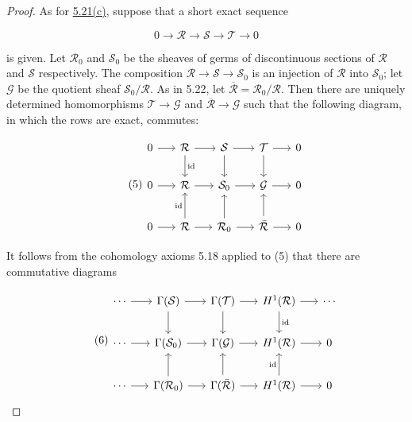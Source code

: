 \begin{proof}
As for \hyperref[thm:5.21]{5.21(c)}, suppose that a short exact sequence

\begin{equation}
\tag{4}\label{eq:5.23:4}
0\to\mathcal{R}\to\mathcal{S}\to\mathcal{T}\to0
\end{equation}

is given. Let $\mathcal{R}_{0}$ and $\mathcal{S}_{0}$ be the sheaves of germs of discontinuous sections of $\mathcal{R}$ and $\mathcal{S}$ respectively. The composition $\mathcal{R}\to\mathcal{S}\to\mathcal{S}_{0}$ is an injection of $\mathcal{R}$ into $\mathcal{S}_{0}$; let $\mathcal{G}$ be the quotient sheaf $\mathcal{S}_{0}/\mathcal{R}$. As in 5.22, let $\overline{\mathcal{R}}=\mathcal{R}_{0}/\mathcal{R}$. Then there are uniquely determined homomorphisms $\mathcal{T}\to\mathcal{G}$ and $\overline{\mathcal{R}}\to\mathcal{G}$ such that the following diagram, in which the rows are exact, commutes:

\begin{equation}
\tag{5}\label{eq:5.23:5}
\begin{tikzcd}[ampersand replacement=\&, column sep=1.6em,row sep=2em]
0 \arrow[r] \& \mathcal R \arrow[r] \arrow[d ,"{\mathrm{id}}"] \& \mathcal S \arrow[r] \arrow[d] \& \mathcal T \arrow[r] \arrow[d] \& 0 \\
0 \arrow[r] \& \mathcal R \arrow[r] \& \mathcal S_0 \arrow[r] \& \mathcal G \arrow[r] \& 0 \\
0 \arrow[r] \& \mathcal R \arrow[r] \arrow[u ,"{\mathrm{id}}"] \& \mathcal R_0 \arrow[r] \arrow[u] \& \bar{\mathcal R} \arrow[r] \arrow[u] \& 0
\end{tikzcd}
\end{equation}

It follows from the cohomology axioms 5.18 applied to (5) that there are commutative diagrams

\begin{equation}
\tag{6}\label{eq:5.23:6}
\begin{tikzcd}[ampersand replacement=\&, column sep=1.6em,row sep=2em]
\cdots \arrow[r] \& \Gamma(\mathcal S) \arrow[r] \arrow[d] \& \Gamma(\mathcal T) \arrow[r] \arrow[d] \& H^{1}(\mathcal R) \arrow[r] \arrow[d ,"{\mathrm{id}}"] \& \cdots \\
\cdots \arrow[r] \& \Gamma(\mathcal S_0) \arrow[r] \& \Gamma(\mathcal G) \arrow[r] \& H^{1}(\mathcal R) \arrow[r] \& 0 \\
\cdots \arrow[r] \& \Gamma(\mathcal R_0) \arrow[r] \arrow[u] \& \Gamma(\bar{\mathcal R}) \arrow[r] \arrow[u] \& H^{1}(\mathcal R) \arrow[r] \arrow[u ,"{\mathrm{id}}"] \& 0
\end{tikzcd}
\end{equation}


\end{proof}
